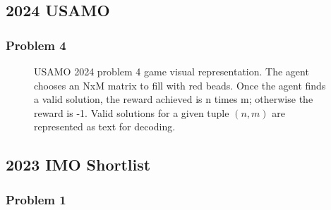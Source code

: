 \newpage
\clearpage


\subsection*{2024 USAMO}
\label{appendix:G_2024_USAMO}

\subsubsection*{Problem 4}
\begin{figure}[htb]
  \centering
  
  \begin{subfigure}[b]{0.32\textwidth}
    \centering
  \setlength{\fboxsep}{0.5pt} 
  \setlength{\fboxrule}{0.5pt} 
  \end{subfigure}
  \hfill
  \begin{subfigure}[b]{0.32\textwidth}
    \centering
  \setlength{\fboxsep}{0.5pt} 
  \setlength{\fboxrule}{0.5pt} 
  \end{subfigure}
  \hfill
  \begin{subfigure}[b]{0.32\textwidth}
    \centering
  \setlength{\fboxsep}{0.5pt} 
  \setlength{\fboxrule}{0.5pt} 
  \end{subfigure}
  \caption{USAMO 2024 problem 4 game visual representation. The agent chooses an NxM matrix to fill with red beads. Once the agent finds a valid solution, the reward achieved is n times m; otherwise the reward is -1. Valid solutions for a given tuple $(n,m)$ are represented as text for decoding.}
  \label{fig:usamo2024-c4}
\end{figure}





\newpage
\clearpage


\subsection*{2023 IMO Shortlist}
\label{appendix:G_2023_IMO_Shortlist}

\subsubsection*{Problem 1}
\label{appendix:G_2023_IMO_Shortlist_C1}


